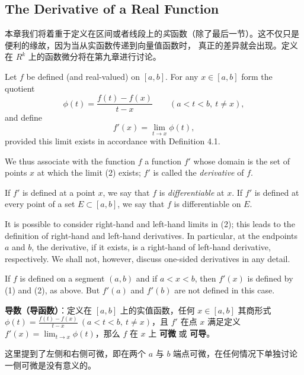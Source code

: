 \documentclass[../poma-notes.tex]{subfiles}
\begin{document}
\subsection*{The Derivative of a Real Function}

本章我们将着重于定义在区间或者线段上的\textit{实}函数（除了最后一节）。这不仅只是便利的缘故，因为当从实函数传递到向量值函数时，
真正的差异就会出现。定义在 $R^k$ 上的函数微分将在第九章进行讨论。

\begin{definition}
  Let $f$ be defined (and real-valued) on $[a, b]$. For any $x \in [a,b]$ form the quotient
  \begin{equation}
    \phi(t) = \frac{f(t) - f(x)}{t - x} \qquad (a<t<b,\ t \ne x),
  \end{equation}
  and define
  \begin{equation}
    f'(x) = \lim_{t \to x} \phi(t),
  \end{equation}
  provided this limit exists in accordance with Definition 4.1.

  We thus associate with the function $f$ a function $f'$ whose domain is the set of points $x$ at which the
  limit (2) exists; $f'$ is called the \textit{derivative} of $f$.

  If $f'$ is defined at a point $x$, we say that $f$ is \textit{differentiable} at $x$. If $f'$ is defined at
  every point of a set $E \subset [a,b]$, we say that $f$ is differentiable on $E$.

  It is possible to consider right-hand and left-hand limits in (2); this leads to the definition of right-hand
  and left-hand derivatives. In particular, at the endpoints $a$ and $b$, the derivative, if it exists, is a
  right-hand of left-hand derivative, respectively. We shall not, however, discuss one-sided derivatives in
  any detail.

  If $f$ is defined on a segment $(a, b)$ and if $a<x<b$, then $f'(x)$ is defined by (1) and (2), as above.
  But $f'(a)$ and $f'(b)$ are not defined in this case.
\end{definition}

\begin{anote}
  \textbf{导数（导函数）}：定义在 $[a, b]$ 上的实值函数，任何 $x \in [a, b]$ 其商形式 $\phi(t)=\frac{f(t)-f(x)}{t-x}
    \ (a < t < b,\ t \ne x)$，且 $f'$ 在点 $x$ 满足定义 $f'(x) = \lim_{t \to x} \phi(t)$，那么 $f$ 在 $x$ 上
  \textbf{可微} 或 \textbf{可导}。

  这里提到了左侧和右侧可微，即在两个 $a$ 与 $b$ 端点可微，在任何情况下单独讨论一侧可微是没有意义的。
\end{anote}
\end{document}
